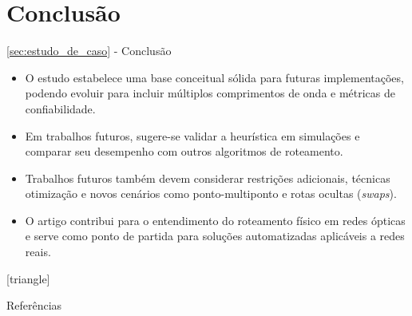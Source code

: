 \documentclass[aspectratio=169,xcolor=dvipsnames]{beamer}
\begin{document}
\section{Conclusão}\label{sec:conclusao}
\begin{frame}{\ref{sec:estudo_de_caso} - Conclusão}
  \begin{itemize}
    \item O estudo estabelece uma base conceitual sólida para futuras implementações, podendo evoluir para incluir múltiplos comprimentos de onda e métricas de confiabilidade.
    \item Em trabalhos futuros, sugere-se validar a heurística em simulações e comparar seu desempenho com outros algoritmos de roteamento.
    \item Trabalhos futuros também devem considerar restrições adicionais, técnicas otimização e novos cenários como ponto-multiponto e rotas ocultas (\textit{swaps}).
    \item O artigo contribui para o entendimento do roteamento físico em redes ópticas e serve como ponto de partida para soluções automatizadas aplicáveis a redes reais.
  \end{itemize}
\end{frame}

[triangle]
\begin{frame}[shrink=16]{Referências}
    \nocite{*}
    \footnotesize
    
    
\end{frame}
\end{document}
